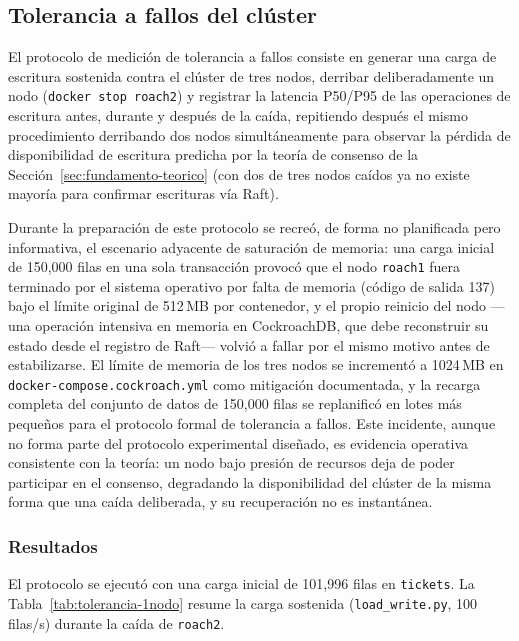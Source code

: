 \subsection{Tolerancia a fallos del clúster}

El protocolo de medición de tolerancia a fallos consiste en generar una carga de escritura
sostenida contra el clúster de tres nodos, derribar deliberadamente un nodo
(\texttt{docker stop roach2}) y registrar la latencia P50/P95 de las operaciones de escritura
antes, durante y después de la caída, repitiendo después el mismo procedimiento derribando dos
nodos simultáneamente para observar la pérdida de disponibilidad de escritura predicha por la
teoría de consenso de la Sección~\ref{sec:fundamento-teorico} (con dos de tres nodos caídos ya no
existe mayoría para confirmar escrituras vía Raft).

Durante la preparación de este protocolo se recreó, de forma no planificada pero informativa, el
escenario adyacente de saturación de memoria: una carga inicial de 150{,}000 filas en una sola
transacción provocó que el nodo \texttt{roach1} fuera terminado por el sistema operativo por falta
de memoria (código de salida 137) bajo el límite original de 512\,MB por contenedor, y el propio
reinicio del nodo —una operación intensiva en memoria en CockroachDB, que debe reconstruir su
estado desde el registro de Raft— volvió a fallar por el mismo motivo antes de estabilizarse. El
límite de memoria de los tres nodos se incrementó a 1024\,MB en
\texttt{docker-compose.cockroach.yml} como mitigación documentada, y la recarga completa del
conjunto de datos de 150{,}000 filas se replanificó en lotes más pequeños para el protocolo formal
de tolerancia a fallos. Este incidente, aunque no forma parte del protocolo experimental
diseñado, es evidencia operativa consistente con la teoría: un nodo bajo presión de recursos deja
de poder participar en el consenso, degradando la disponibilidad del clúster de la misma forma
que una caída deliberada, y su recuperación no es instantánea.

\subsubsection{Resultados}

El protocolo se ejecutó con una carga inicial de 101{,}996 filas en \texttt{tickets}. La
Tabla~\ref{tab:tolerancia-1nodo} resume la carga sostenida (\texttt{load\_write.py},
100 filas/s) durante la caída de \texttt{roach2}.

